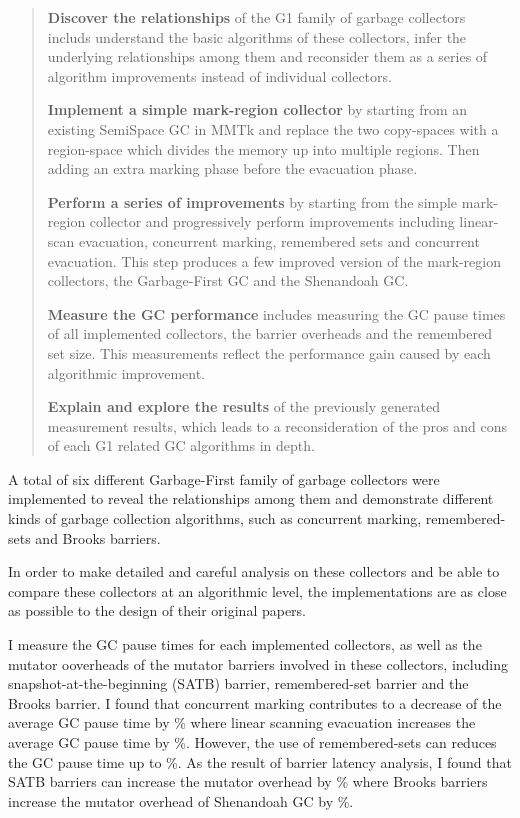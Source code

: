 \begin{quote}
  \textbf{Discover the relationships}
    of the G1 family of garbage collectors includs understand the basic algorithms
    of these collectors, infer the underlying relationships among them and reconsider them as
    a series of algorithm improvements instead of individual collectors.

  \textbf{Implement a simple mark-region collector}
    by starting from an existing SemiSpace GC in MMTk and replace the two copy-spaces
    with a region-space which divides the memory up into multiple regions.
    Then adding an extra marking phase before the evacuation phase.

  \textbf{Perform a series of improvements}
    by starting from the simple mark-region collector and progressively perform
    improvements including linear-scan evacuation, concurrent marking, remembered sets
    and concurrent evacuation. This step produces a few improved version of the
    mark-region collectors, the Garbage-First GC and the Shenandoah GC.

  \textbf{Measure the GC performance}
    includes measuring the GC pause times of all implemented collectors, the 
    barrier overheads and the remembered set size. This measurements reflect the
    performance gain caused by each algorithmic improvement.

  \textbf{Explain and explore the results}
    of the previously generated measurement results, which leads to a reconsideration
    of the pros and cons of each G1 related GC algorithms in depth.
\end{quote}

A total of six different Garbage-First family of garbage collectors were implemented to reveal
the relationships among them and demonstrate different kinds of garbage collection
algorithms, such as concurrent marking, remembered-sets and Brooks barriers.

In order to make detailed and careful analysis on these collectors and
be able to compare these collectors at an algorithmic level, the implementations
are as close as possible to the design of their original papers.

I measure the GC pause times for each implemented collectors, as well as the mutator
ooverheads of the mutator barriers involved in these collectors, including
snapshot-at-the-beginning (SATB) barrier, remembered-set barrier and the Brooks barrier.
I found that concurrent marking contributes to a decrease of the average GC pause time by \%
where linear scanning evacuation increases the average GC pause time by \%.
However, the use of remembered-sets can reduces the GC pause time up to \%.
As the result of barrier latency analysis, I found that SATB barriers can
increase the mutator overhead by \% where Brooks barriers
increase the mutator overhead of Shenandoah GC by \%.

